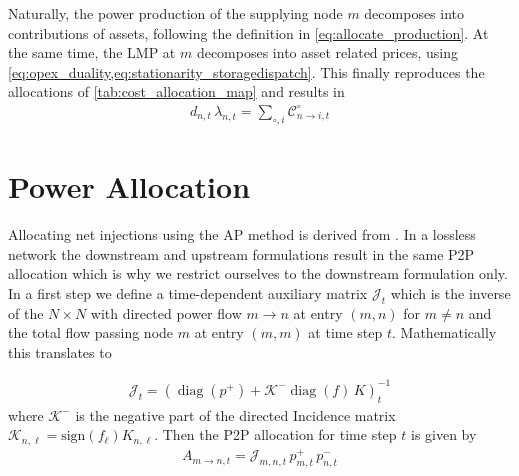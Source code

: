 \documentclass[11pt,twocolumn]{article}
\newcommand{\lmp}[1][n]{\lambda_{#1,t}}
\newcommand{\demand}[1][n]{d_{#1,t}}
\newcommand{\netconsumption}[1][n]{p^{-}_{#1,t}}
\newcommand{\netproduction}[1][n]{p^{+}_{#1,t}}
\newcommand{\incidence}[1][n]{K_{#1,\ell}}
\newcommand{\cost}[1][\circ]{\mathcal{C}^{#1}}
\newcommand{\allocatepeer}[1][m \rightarrow n]{A_{#1,t}}
\newcommand{\allocatecost}[1][n \rightarrow i]{\cost_{#1, t}}
\begin{document}
Naturally, the power production of the supplying node $m$ decomposes into contributions of assets, following the definition in \cref{eq:allocate_production}. At the same time, the LMP at $m$ decomposes into asset related prices, using \cref{eq:opex_duality,eq:stationarity_storagedispatch}. This finally reproduces the allocations of \cref{tab:cost_allocation_map} and results in 
\begin{align}
    \demand \, \lmp =  \sum_{\circ, i} \allocatecost 
\end{align}


\section{Power Allocation}
\label{sec:net_ap}

\newcommand{\incidenceM}{K}
\newcommand{\flowM}{f}
\newcommand{\injectionM}{p}
\newcommand{\slackM}{k}
\newcommand{\DirectedIncidence}{\mathcal{K}}
\newcommand{\InverseAPInjection}{\mathcal{J}}
\newcommand\diag[1]{\operatorname{diag}\left(#1\right)}


Allocating net injections using the AP method is derived from \cite{achayuthakan_electricity_2010}. In a lossless network the downstream and upstream formulations result in the same P2P allocation which is why we restrict ourselves to the downstream formulation only. In a first step we define a time-dependent auxiliary matrix $\InverseAPInjection_t$ which is the inverse of the $N\times N$ with directed power flow $m \rightarrow n$ at entry $(m, n)$ for $m \ne n$ and the total flow passing node $m$ at entry $\left( m, m\right)$ at time step $t$. Mathematically this translates to


\begin{align}
\InverseAPInjection_t = \left( \diag{\injectionM^+} + \DirectedIncidence^- \diag{\flowM} \, \incidenceM \right)_t^{-1} 
\end{align}
where $\DirectedIncidence^-$ is the negative part of the directed Incidence matrix $\DirectedIncidence_{n,\ell} = \text{sign}\left( f_\ell \right)  \incidence$. Then the P2P allocation for time step $t$ is given by
\begin{align}
\allocatepeer = \InverseAPInjection_{m,n,t} \, \netproduction[m] \, \netconsumption
\end{align}
\end{document}
